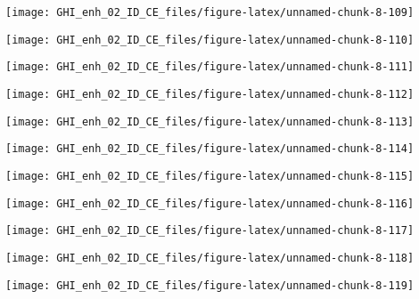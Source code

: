 \documentclass[
  10pt,
  a4paper,oneside]{article}
\begin{document}
\begin{center}\texttt{[image: GHI\_enh\_02\_ID\_CE\_files/figure-latex/unnamed-chunk-8-109]} \end{center}

\begin{center}\texttt{[image: GHI\_enh\_02\_ID\_CE\_files/figure-latex/unnamed-chunk-8-110]} \end{center}

\begin{center}\texttt{[image: GHI\_enh\_02\_ID\_CE\_files/figure-latex/unnamed-chunk-8-111]} \end{center}

\begin{center}\texttt{[image: GHI\_enh\_02\_ID\_CE\_files/figure-latex/unnamed-chunk-8-112]} \end{center}

\begin{center}\texttt{[image: GHI\_enh\_02\_ID\_CE\_files/figure-latex/unnamed-chunk-8-113]} \end{center}

\begin{center}\texttt{[image: GHI\_enh\_02\_ID\_CE\_files/figure-latex/unnamed-chunk-8-114]} \end{center}

\begin{center}\texttt{[image: GHI\_enh\_02\_ID\_CE\_files/figure-latex/unnamed-chunk-8-115]} \end{center}

\begin{center}\texttt{[image: GHI\_enh\_02\_ID\_CE\_files/figure-latex/unnamed-chunk-8-116]} \end{center}

\begin{center}\texttt{[image: GHI\_enh\_02\_ID\_CE\_files/figure-latex/unnamed-chunk-8-117]} \end{center}

\begin{center}\texttt{[image: GHI\_enh\_02\_ID\_CE\_files/figure-latex/unnamed-chunk-8-118]} \end{center}

\begin{center}\texttt{[image: GHI\_enh\_02\_ID\_CE\_files/figure-latex/unnamed-chunk-8-119]} \end{center}
\end{document}
